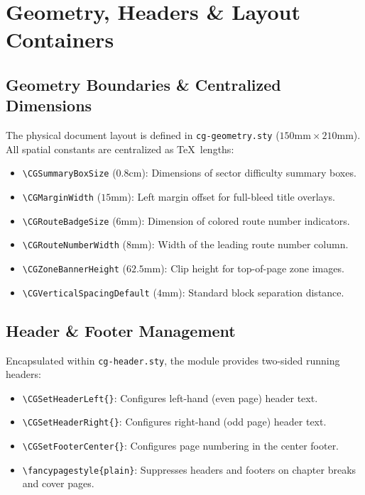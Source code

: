 \clearpage
\section{Geometry, Headers \& Layout Containers}

\subsection{Geometry Boundaries \& Centralized Dimensions}
The physical document layout is defined in \texttt{cg-geometry.sty} ($150\text{mm} \times 210\text{mm}$). All spatial constants are centralized as \TeX\ lengths:
\begin{itemize}
    \item \texttt{\textbackslash CGSummaryBoxSize} ($0.8\text{cm}$): Dimensions of sector difficulty summary boxes.
    \item \texttt{\textbackslash CGMarginWidth} ($15\text{mm}$): Left margin offset for full-bleed title overlays.
    \item \texttt{\textbackslash CGRouteBadgeSize} ($6\text{mm}$): Dimension of colored route number indicators.
    \item \texttt{\textbackslash CGRouteNumberWidth} ($8\text{mm}$): Width of the leading route number column.
    \item \texttt{\textbackslash CGZoneBannerHeight} ($62.5\text{mm}$): Clip height for top-of-page zone images.
    \item \texttt{\textbackslash CGVerticalSpacingDefault} ($4\text{mm}$): Standard block separation distance.
\end{itemize}

\subsection{Header \& Footer Management}
Encapsulated within \texttt{cg-header.sty}, the module provides two-sided running headers:
\begin{itemize}
    \item \texttt{\textbackslash CGSetHeaderLeft\{<text:tl>\}}: Configures left-hand (even page) header text.
    \item \texttt{\textbackslash CGSetHeaderRight\{<text:tl>\}}: Configures right-hand (odd page) header text.
    \item \texttt{\textbackslash CGSetFooterCenter\{<text:tl>\}}: Configures page numbering in the center footer.
    \item \texttt{\textbackslash fancypagestyle\{plain\}}: Suppresses headers and footers on chapter breaks and cover pages.
\end{itemize}

